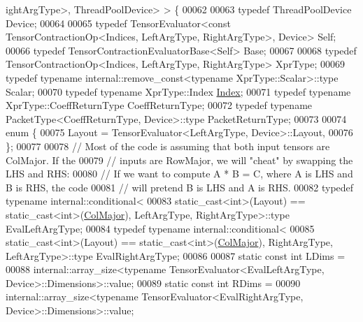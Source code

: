 \begin{DoxyCode}
      ightArgType>, ThreadPoolDevice> > \{
00062 
00063   \textcolor{keyword}{typedef} ThreadPoolDevice Device;
00064 
00065   \textcolor{keyword}{typedef} TensorEvaluator<const TensorContractionOp<Indices, LeftArgType, RightArgType>, Device> Self;
00066   \textcolor{keyword}{typedef} TensorContractionEvaluatorBase<Self> Base;
00067 
00068   \textcolor{keyword}{typedef} TensorContractionOp<Indices, LeftArgType, RightArgType> XprType;
00069   \textcolor{keyword}{typedef} \textcolor{keyword}{typename} internal::remove\_const<typename XprType::Scalar>::type Scalar;
00070   \textcolor{keyword}{typedef} \textcolor{keyword}{typename} XprType::Index \hyperlink{namespace_eigen_a62e77e0933482dafde8fe197d9a2cfde}{Index};
00071   \textcolor{keyword}{typedef} \textcolor{keyword}{typename} XprType::CoeffReturnType CoeffReturnType;
00072   \textcolor{keyword}{typedef} \textcolor{keyword}{typename} PacketType<CoeffReturnType, Device>::type PacketReturnType;
00073 
00074   \textcolor{keyword}{enum} \{
00075     Layout = TensorEvaluator<LeftArgType, Device>::Layout,
00076   \};
00077 
00078   \textcolor{comment}{// Most of the code is assuming that both input tensors are ColMajor. If the}
00079   \textcolor{comment}{// inputs are RowMajor, we will "cheat" by swapping the LHS and RHS:}
00080   \textcolor{comment}{// If we want to compute A * B = C, where A is LHS and B is RHS, the code}
00081   \textcolor{comment}{// will pretend B is LHS and A is RHS.}
00082   \textcolor{keyword}{typedef} \textcolor{keyword}{typename} internal::conditional<
00083     \textcolor{keyword}{static\_cast<}\textcolor{keywordtype}{int}\textcolor{keyword}{>}(Layout) == static\_cast<int>(\hyperlink{group__enums_ggaacded1a18ae58b0f554751f6cdf9eb13a0cbd4bdd0abcfc0224c5fcb5e4f6669a}{ColMajor}), LeftArgType, RightArgType>::type 
      EvalLeftArgType;
00084   \textcolor{keyword}{typedef} \textcolor{keyword}{typename} internal::conditional<
00085     \textcolor{keyword}{static\_cast<}\textcolor{keywordtype}{int}\textcolor{keyword}{>}(Layout) == static\_cast<int>(\hyperlink{group__enums_ggaacded1a18ae58b0f554751f6cdf9eb13a0cbd4bdd0abcfc0224c5fcb5e4f6669a}{ColMajor}), RightArgType, LeftArgType>::type 
      EvalRightArgType;
00086 
00087   \textcolor{keyword}{static} \textcolor{keyword}{const} \textcolor{keywordtype}{int} LDims =
00088       internal::array\_size<typename TensorEvaluator<EvalLeftArgType, Device>::Dimensions>::value;
00089   \textcolor{keyword}{static} \textcolor{keyword}{const} \textcolor{keywordtype}{int} RDims =
00090       internal::array\_size<typename TensorEvaluator<EvalRightArgType, Device>::Dimensions>::value;

\end{DoxyCode}
